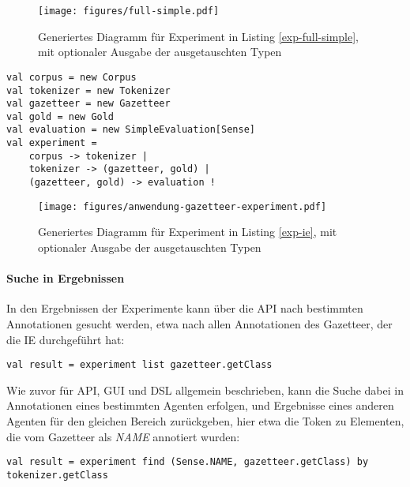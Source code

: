 \documentclass[abstracton, 12pt]{scrartcl}
\begin{document}
\begin{figure}
\begin{center}
  \texttt{[image: figures/full-simple.pdf]}
  \caption{Generiertes Diagramm für Experiment in Listing \ref{exp-full-simple}, mit optionaler Ausgabe der ausgetauschten Typen}
  \label{full-simple}
\end{center}
\end{figure}

\begin{lstlisting}[float, label=exp-ie, caption={Ein einfaches Experiment zur Informationsextraktion, inklusive Evaluierung}]
val corpus = new Corpus
val tokenizer = new Tokenizer
val gazetteer = new Gazetteer
val gold = new Gold
val evaluation = new SimpleEvaluation[Sense]
val experiment = 
    corpus -> tokenizer |
    tokenizer -> (gazetteer, gold) |
    (gazetteer, gold) -> evaluation !
\end{lstlisting}

\begin{figure}
\begin{center}
  \texttt{[image: figures/anwendung-gazetteer-experiment.pdf]}
  \caption{Generiertes Diagramm für Experiment in Listing \ref{exp-ie}, mit optionaler Ausgabe der ausgetauschten Typen}
  \label{anwendung-gazetteer-experiment}
\end{center}
\end{figure}

\paragraph{Suche in Ergebnissen}

In den Ergebnissen der Experimente kann über die API nach bestimmten Annotationen gesucht werden, etwa nach allen Annotationen des Gazetteer, der die IE durchgeführt hat:

\begin{lstlisting}
val result = experiment list gazetteer.getClass
\end{lstlisting}

Wie zuvor für API, GUI und DSL allgemein beschrieben, kann die Suche dabei in Annotationen eines bestimmten Agenten erfolgen, und Ergebnisse eines anderen Agenten für den gleichen Bereich zurückgeben, hier etwa die Token zu Elementen, die vom Gazetteer als \emph{NAME} annotiert wurden:

\begin{lstlisting}
val result = experiment find (Sense.NAME, gazetteer.getClass) by tokenizer.getClass
\end{lstlisting}
\end{document}
